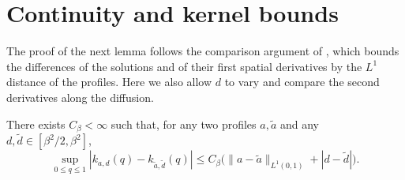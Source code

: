 \section{Continuity and kernel bounds}
\label{sec:sc-kernels}

The proof of the next lemma follows the comparison argument of
\cite[Lemma~14]{JagannathTobasco2016}, which bounds the differences of
the solutions and of their first spatial derivatives by the $L^1$
distance of the profiles. Here we also allow $d$ to vary and compare
the second derivatives along the diffusion.

\begin{lemma}\label{lem:scalarcontinuity}
There exists $C_\beta<\infty$ such that, for any two profiles
$a,\widetilde a$ and any $d,\widetilde d\in[\beta^2/2,\beta^2]$,
\begin{equation}\label{eq:scalarcontinuity}
 \sup_{0\le q\le1}|k_{a,d}(q)-k_{\widetilde a,\widetilde d}(q)|
 \le C_\beta\bigl(\|a-\widetilde a\|_{L^1(0,1)}+|d-\widetilde d|\bigr).
\end{equation}
\end{lemma}

